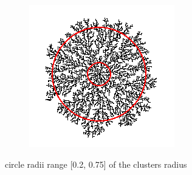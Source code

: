 \documentclass[12pt,a4paper]{scrartcl}
\newcommand{\1}{\mathbbm{1}}
\theoremstyle{definition}
\numberwithin{equation}{section}
\begin{document}
\begin{figure}[t]
\begin{subfigure}[b]{.31\textwidth}
	\end{subfigure}
	\begin{subfigure}[b]{.31\textwidth}
		\includegraphics[width=1\linewidth]{images/fractal_range/2.PNG}
	\end{subfigure}
	\caption{circle radii range [0.2, 0.75] of the clusters radius}
	\label{filledup}
\end{figure}
\end{document}
